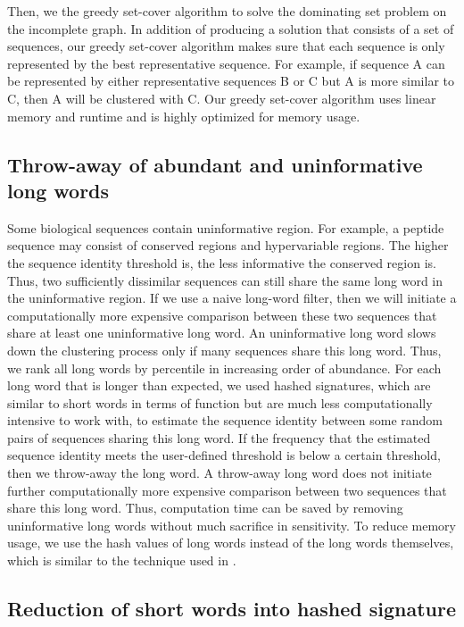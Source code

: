 \documentclass[11pt,letterpaper]{llncs2e/llncs}
\begin{document}
Then, we the greedy set-cover algorithm to solve the dominating set problem on the incomplete graph.
In addition of producing a solution that consists of a set of sequences, 
our greedy set-cover algorithm makes sure that each sequence is only represented by the best representative sequence.
For example, if sequence A can be represented by either representative sequences B or C but A is more similar to C,
then A will be clustered with C.
Our greedy set-cover algorithm uses linear memory and runtime and is highly optimized for memory usage.

\subsection{Throw-away of abundant and uninformative long words}

Some biological sequences contain uninformative region.
For example, a peptide sequence may consist of conserved regions and hypervariable regions.
The higher the sequence identity threshold is, the less informative the conserved region is.
Thus, two sufficiently dissimilar sequences can still share the same long word in the uninformative region.
If we use a naive long-word filter, then we will initiate a computationally more expensive comparison between these two sequences that share at least one uninformative long word.
An uninformative long word slows down the clustering process only if many sequences share this long word.
Thus, we rank all long words by percentile in increasing order of abundance.
For each long word that is longer than expected, we used hashed signatures, which are similar to short words in terms of function but are much less computationally intensive to work with, to estimate the sequence identity between some random pairs of sequences sharing this long word.
If the frequency that the estimated sequence identity meets the user-defined threshold is below a certain threshold,
then we throw-away the long word.
A throw-away long word does not initiate further computationally more expensive comparison between two sequences that share this long word.
Thus, computation time can be saved by removing uninformative long words without much sacrifice in sensitivity.
To reduce memory usage, we use the hash values of long words instead of the long words themselves, which is similar to the technique used in \citet{steinegger2017Linclust}.

\subsection{Reduction of short words into hashed signature}
\end{document}
